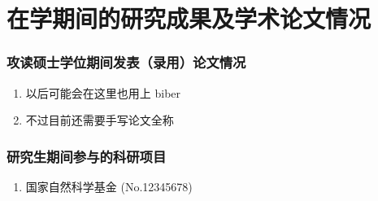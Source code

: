 \chapter{在学期间的研究成果及学术论文情况}


\subsection*{攻读硕士学位期间发表（录用）论文情况}

\begin{enumerate}
  \item 以后可能会在这里也用上 biber
  \item 不过目前还需要手写论文全称
\end{enumerate}

\subsection*{研究生期间参与的科研项目}

\begin{enumerate}
  \item 国家自然科学基金 (No.12345678)
\end{enumerate}
